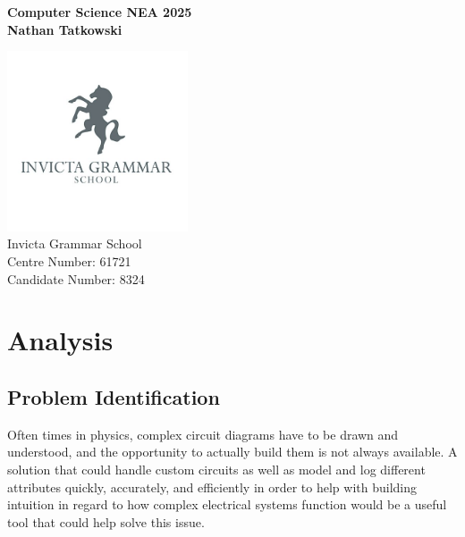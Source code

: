 \documentclass[11pt]{article}
\begin{document}
    \pagestyle{fancy}
    \setlength{\headheight}{13.6pt}

    \begin{titlepage}
        \begin{center}
            \vspace*{1cm}
            \Huge
            \textbf{Computer Science NEA 2025} \\
            \vspace*{2cm}
            \LARGE
            \textbf{Nathan Tatkowski}

            \vfill
            \includegraphics*[width=0.4\textwidth]{figures/igsLogo.jpg} \\
            \Large
            Invicta Grammar School \\
            Centre Number: 61721 \\
            Candidate Number: 8324
        \end{center}
    \end{titlepage}

    \tableofcontents

    \newpage
    \listoffigures

    \newpage
    \listoftables

    \newpage
    \lstlistoflistings

    \pagebreak



    \section{Analysis}

        \subsection{Problem Identification}
            Often times in physics, complex circuit diagrams have to be drawn and understood, and the opportunity to actually build them is not always available. A solution that could handle custom circuits as well as model and log different attributes quickly, accurately, and efficiently in order to help with building intuition in regard to how complex electrical systems function would be a useful tool that could help solve this issue.
\end{document}
